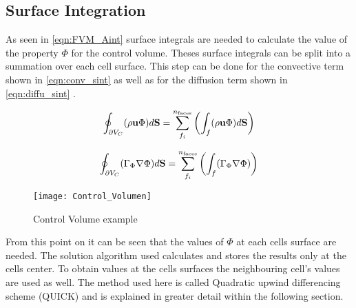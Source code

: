 \documentclass[../thesis.tex]{subfiles}
\begin{document}
\subsection{Surface Integration}

As seen in \autoref{eqn:FVM_Aint} surface integrals are needed to calculate the value of the property $\Phi$ for the control volume. Theses surface integrals can be split into a summation over each cell surface. This step can be done for the convective term shown in \autoref{eqn:conv_sint} as well as for the diffusion term shown in \autoref{eqn:diffu_sint} \cite{darwish2021finite}.

\begin{equation}
	\label{eqn:conv_sint}
	\oint_{\partial V_C} (\rho \bold{u} \Phi) d\bold{S} = \sum_{f_i}^{n_{\text{faces}}}\left( \int_{f} (\rho \bold{u} \Phi) d\bold{S} \right)
\end{equation}

\begin{equation}
	\label{eqn:diffu_sint}
	\oint_{\partial V_C} (\Gamma_\Phi \nabla \Phi) d\bold{S} =  \sum_{f_i}^{n_{\text{faces}}}\left( \int_{f} (\Gamma_\Phi \nabla \Phi) \right)
\end{equation} 

\begin{figure}[htbp]
	\centering
	\texttt{[image: Control\_Volumen]}
	\caption{Control Volume example}
	\label{fig:FVM_CV}
\end{figure}

From this point on it can be seen that the values of $\Phi$ at each cells surface are needed. The solution algorithm used calculates and stores the results only at the cells center. To obtain values at the cells surfaces the neighbouring cell's values are used as well. The method used here is called Quadratic upwind differencing scheme (QUICK) and is explained in greater detail within the following section.
\end{document}

